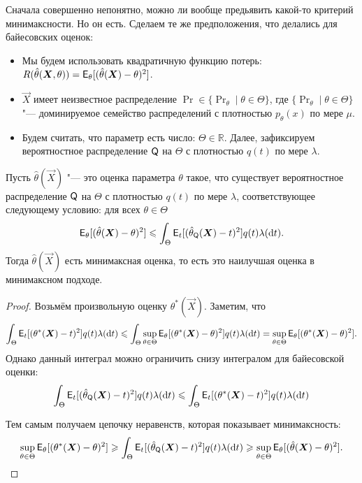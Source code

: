 Сначала совершенно непонятно, можно ли вообще предьявить какой-то критерий минимаксности. Но он есть. Сделаем те же предположения, что делались для байесовских оценок:
\begin{itemize}
    \item Мы будем использовать квадратичную функцию потерь: $R(\hat{\theta}(\bm{X}, \theta)) = \operatorname{\mathsf{E}}_{\theta}[(\hat{\theta}(\bm{X}) - \theta)^{2}]$.
    \item $\vec{X}$ имеет неизвестное распределение $\Pr \in \{\Pr_{\theta} \mid \theta \in \Theta\}$, где $\{\Pr_{\theta} \mid \theta \in \Theta\}$ "--- доминируемое семейство распределений с плотностью $p_{\theta}(x)$ по мере $\mu$.
    \item Будем считать, что параметр есть число: $\Theta \in \mathbb{R}$. Далее, зафиксируем вероятностное распределение $\mathsf{Q}$ на $\Theta$ с плотностью $q(t)$ по мере $\lambda$.
\end{itemize}
\begin{lemma}
    Пусть $\hat{\theta}(\vec{X})$ "--- это оценка параметра $\theta$ такое, что существует вероятностное распределение $\mathsf{Q}$ на $\Theta$ с плотностью $q(t)$ по мере $\lambda$, соответствующее следующему условию: для всех $\theta \in \Theta$
    \[
        \operatorname{\mathsf{E}}_{\theta}[(\hat{\theta}(\bm{X}) - \theta)^{2}]
        \leqslant \int_{\Theta} \operatorname{\mathsf{E}}_{t}[(\hat{\theta}_{\mathsf{Q}}(\bm{X}) - t)^{2}]q(t)\lambda(\dd t).
    \]
    Тогда $\hat{\theta}(\vec{X})$ есть минимаксная оценка, то есть это наилучшая оценка в минимаксном подходе.
\end{lemma}
\begin{proof}
    Возьмём произвольную оценку $\theta^{*}(\vec{X})$. Заметим, что
    \[
        \int_{\Theta} \operatorname{\mathsf{E}}_{t}[(\theta^{*}(\bm{X}) - t)^{2}]q(t)\lambda(\dd t) \leqslant  \int_{\Theta} \sup_{\theta \in \Theta} \operatorname{\mathsf{E}}_{\theta}[(\theta^{*}(\bm{X}) - \theta)^{2}]q(t)\lambda(\dd t) = \sup_{\theta \in \Theta} \operatorname{\mathsf{E}}_{\theta}[(\theta^{*}(\bm{X}) - \theta)^{2}].
    \]
    Однако данный интеграл можно ограничить снизу интегралом для байесовской оценки:
    \[
        \int_{\Theta} \operatorname{\mathsf{E}}_{t}[(\hat{\theta}_{\mathsf{Q}}(\bm{X}) - t)^{2}]q(t)\lambda(\dd t) \leqslant \int_{\Theta} \operatorname{\mathsf{E}}_{t}[(\theta^{*}(\bm{X}) - t)^{2}]q(t)\lambda(\dd t)
    \]
    
    Тем самым получаем цепочку неравенств, которая показывает минимаксность:
    \[
        \sup_{\theta \in \Theta} \operatorname{\mathsf{E}}_{\theta}[(\theta^{*}(\bm{X}) - \theta)^{2}] \geqslant \int_{\Theta} \operatorname{\mathsf{E}}_{t}[(\hat{\theta}_{\mathsf{Q}}(\bm{X}) - t)^{2}]q(t)\lambda(\dd t) \geqslant \sup_{\theta \in \Theta} \operatorname{\mathsf{E}}_{\theta}[(\hat{\theta}(\bm{X}) - \theta)^{2}]. \qedhere
    \]
\end{proof}
